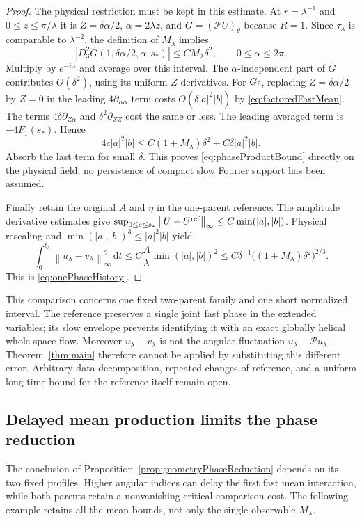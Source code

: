 \documentclass[11pt]{article}
\theoremstyle{remark}
\newcommand{\PP}{\mathcal P}
\newcommand{\dd}{\,\mathrm d}
\newcommand{\norm}[1]{\left\lVert#1\right\rVert}
\begin{document}
\begin{proof}
The physical restriction must be kept in this estimate. At
$r=\lambda^{-1}$ and $0\leq z\leq\pi/\lambda$ it is
$Z=\delta\alpha/2$, $\alpha=2\lambda z$, and $G= (\PP U)_\theta$
because $R=1$. Since $\tau_\lambda$ is comparable to $\lambda^{-2}$,
the definition of $M_\lambda$ implies
\[
 |D_3^2G(1,\delta\alpha/2,\alpha,s_*)|
                    \leq C M_\lambda\delta^2,
             \qquad 0\leq\alpha\leq2\pi.
\]
Multiply by $e^{-i\alpha}$ and average over this interval.
The $\alpha$-independent part of $G$ contributes $O(\delta^2)$,
using its uniform $Z$ derivatives. For $G_{\rm f}$, replacing
$Z=\delta\alpha/2$ by $Z=0$ in the leading
$4\partial_{\alpha\alpha}$ term costs
$O(\delta|a|^2|b|)$ by \eqref{eq:factoredFastMean}.
The terms $4\delta\partial_{Z\alpha}$ and
$\delta^2\partial_{ZZ}$ cost the same or less.
The leading averaged term is $-4F_1(s_*)$. Hence
\[
 4c|a|^2|b|
    \leq C(1+M_\lambda)\delta^2+C\delta|a|^2|b|.
\]
Absorb the last term for small $\delta$. This proves
\eqref{eq:phaseProductBound} directly on the physical field;
no persistence of compact slow Fourier support has been assumed.

Finally retain the original $A$ and $\eta$ in the one-parent
reference. The amplitude derivative estimates give
$\sup_{0\leq s\leq s_*}\norm{U-U^{\rm ref}}_\infty
 \leq C\min(|a|,|b|)$.
Physical rescaling and
$\min(|a|,|b|)^3\leq|a|^2|b|$ yield
\[
 \int_0^{t_\lambda}\norm{u_\lambda-v_\lambda}_\infty^2\dd t
 \leq C\frac A\lambda\min(|a|,|b|)^2
 \leq C\delta^{-1}\big((1+M_\lambda)\delta^2\big)^{2/3}.
\]
This is \eqref{eq:onePhaseHistory}.
\end{proof}

This comparison concerns one fixed two-parent family and one short
normalized interval. The reference preserves a single joint fast
phase in the extended variables; its slow envelope prevents identifying
it with an exact globally helical whole-space flow. Moreover
$u_\lambda-v_\lambda$ is not the angular fluctuation
$u_\lambda-\PP u_\lambda$. Theorem~\ref{thm:main} therefore cannot
be applied by substituting this different error. Arbitrary-data
decomposition, repeated changes of reference, and a uniform long-time
bound for the reference itself remain open.

\subsection{Delayed mean production limits the phase reduction}

The conclusion of Proposition~\ref{prop:geometryPhaseReduction}
depends on its two fixed profiles. Higher angular indices can delay
the first fast mean interaction, while both parents retain a nonvanishing
critical comparison cost. The following example retains all the mean
bounds, not only the single observable $M_\lambda$.
\end{document}
